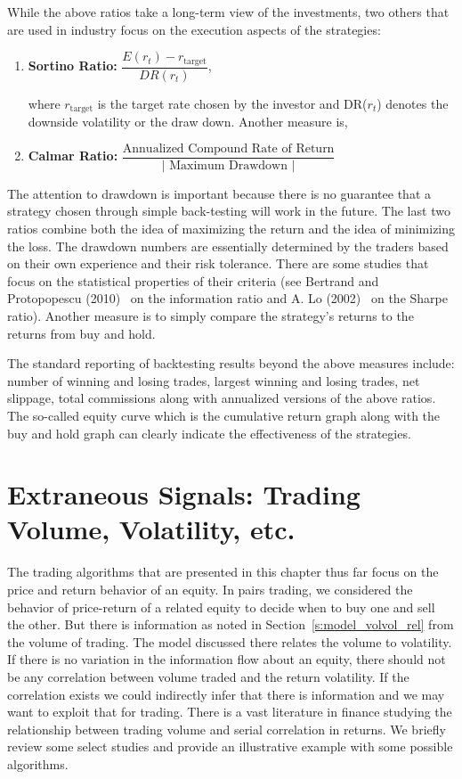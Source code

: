 While the above ratios take a long-term view of the investments, two others that are used in industry focus on the execution aspects of the strategies: 


\begin{enumerate}[--]
\item \textbf{Sortino Ratio: } $\dfrac{E(r_{t}) - r_{\text{target}}}{DR(r_{t})}$, \twomedskip

\noindent where $r_{\text{target}}$ is the target rate chosen by the investor and DR($r_t$) denotes the downside volatility or the draw down. Another measure is, \twomedskip

\item \textbf{Calmar Ratio: } $\dfrac{\text{Annualized Compound Rate of Return}}{\left| \text{ Maximum Drawdown }\right|}$ \twomedskip
\end{enumerate}


The attention to drawdown is important because there is no guarantee that a strategy chosen through simple back-testing will work in the future. The last two ratios combine both the idea of maximizing the return and the idea of minimizing the loss. The drawdown numbers are essentially determined by the traders based on their own experience and their risk tolerance. There are some studies that focus on the statistical properties of their criteria (see Bertrand and Protopopescu (2010)~\cite{bertrand} on the information ratio and A. Lo (2002)~\cite{awlo} on the Sharpe ratio). Another measure is to simply compare the strategy's returns to the returns from buy and hold.


The standard reporting of backtesting results beyond the above measures include: number of winning and losing trades, largest winning and losing trades, net slippage, total commissions along with annualized versions of the above ratios. The so-called equity curve which is the cumulative return graph along with the buy and hold graph can clearly indicate the effectiveness of the strategies. 



\section{Extraneous Signals: Trading Volume, Volatility, etc.}


The trading algorithms that are presented in this chapter thus far focus on the price and return behavior of an equity. In pairs trading, we considered the behavior of price-return of a related equity to decide when to buy one and sell the other. But there is information as noted in Section~\ref{s:model_volvol_rel} from the volume of trading. The model discussed there relates the volume to volatility. If there is no variation in the information flow about an equity, there should not be any correlation between volume traded and the return volatility. If the correlation exists we could indirectly infer that there is information and we may want to exploit that for trading. There is a vast literature in finance studying the relationship between trading volume and serial correlation in returns. We briefly review some select studies and provide an illustrative example with some possible algorithms. 


